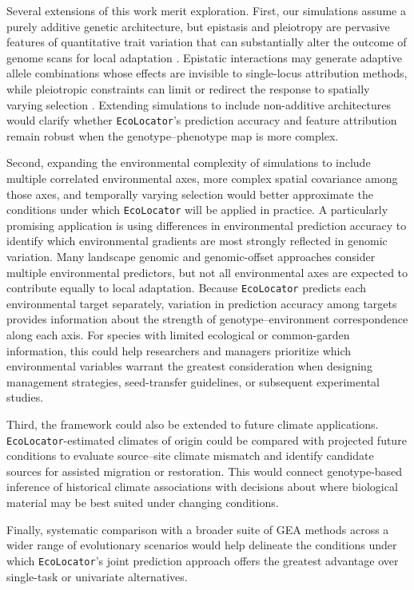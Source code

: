 \documentclass[]{article}
\newcommand{\ecolocator}{\texttt{EcoLocator}\xspace}
\begin{document}
Several extensions of this work merit exploration.
First, our simulations assume a purely additive genetic architecture,
but epistasis and pleiotropy are pervasive features
of quantitative trait variation
\citep{mackay_pleiotropy_2024}
that can substantially alter the outcome
of genome scans for local adaptation
\citep{jones_epistasis_2019}.
Epistatic interactions may generate adaptive allele combinations
whose effects are invisible to single-locus attribution methods,
while pleiotropic constraints can limit
or redirect the response to spatially varying selection
\citep{yeaman_polygenic_2022}.
Extending simulations to include non-additive architectures
would clarify whether \ecolocator's prediction accuracy
and feature attribution remain robust
when the genotype--phenotype map is more complex.

Second, expanding the environmental complexity
of simulations to include multiple correlated environmental axes,
more complex spatial covariance among those axes,
and temporally varying selection would
better approximate the conditions
under which \ecolocator will be applied in practice. 
A particularly promising application is using 
differences in environmental prediction accuracy
to identify which environmental gradients
are most strongly reflected in genomic variation.
Many landscape genomic and genomic-offset approaches
consider multiple environmental predictors,
but not all environmental axes are expected
to contribute equally to local adaptation.
Because \ecolocator predicts each environmental target separately,
variation in prediction accuracy among targets
provides information about the strength
of genotype--environment correspondence along each axis.
For species with limited ecological or common-garden information,
this could help researchers and managers prioritize
which environmental variables warrant the greatest consideration
when designing management strategies,
seed-transfer guidelines,
or subsequent experimental studies.

Third, the framework could also be extended
to future climate applications.
\ecolocator-estimated climates of origin could be compared
with projected future conditions
to evaluate source--site climate mismatch and 
identify candidate sources 
for assisted migration or restoration.
This would connect genotype-based inference
of historical climate associations
with decisions about where biological material
may be best suited under changing conditions. 

Finally, systematic comparison
with a broader suite of GEA methods
across a wider range of evolutionary scenarios
would help delineate the conditions
under which \ecolocator's joint prediction approach
offers the greatest advantage
over single-task or univariate alternatives.
\end{document}
